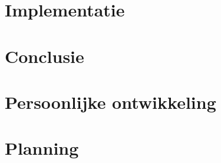 \documentclass[a4paper,11pt,oneside]{report}
\begin{document}
\chapter{Implementatie}











\chapter{Conclusie}




\appendix
\chapter{Persoonlijke ontwikkeling}
\lipsum[1]

\chapter{Planning}
  \label{chap:planning}


\newpage

\printglossary


\renewcommand{\bibname}{Bronvermeldingen}



\nocite{*}

\end{document}

